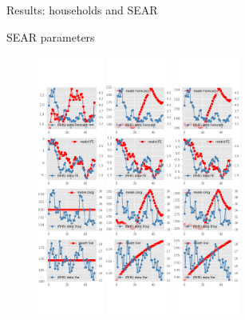 \documentclass{beamer}
\begin{document}
\begin{frame}{Results: households and SEAR}
\begin{frame}{SEAR parameters}
\begin{figure}[ht]
			\includegraphics[width=0.19\textwidth, height = \0.95\textheight]{figures/sce_se_est_diag2.png}
			\includegraphics[width=0.19\textwidth, height = \0.95\textheight]{figures/sce_se_est_diag3.png}
			\includegraphics[width=0.19\textwidth, height = \0.95\textheight]{figures/sce_se_est_diag4.png}
		\end{figure}
	\end{frame}
	

\end{frame}
\end{document}
